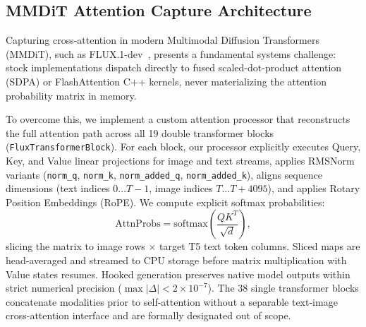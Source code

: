 \subsection{MMDiT Attention Capture Architecture}
\label{sec:method_flux_capture}
Capturing cross-attention in modern Multimodal Diffusion Transformers (MMDiT), such as FLUX.1-dev~\citep{flux2024}, presents a fundamental systems challenge: stock implementations dispatch directly to fused scaled-dot-product attention (SDPA) or FlashAttention C++ kernels, never materializing the attention probability matrix in memory. 

To overcome this, we implement a custom attention processor that reconstructs the full attention path across all 19 double transformer blocks (\texttt{FluxTransformerBlock}). For each block, our processor explicitly executes Query, Key, and Value linear projections for image and text streams, applies RMSNorm variants (\texttt{norm\_q}, \texttt{norm\_k}, \texttt{norm\_added\_q}, \texttt{norm\_added\_k}), aligns sequence dimensions (text indices $0 \dots T-1$, image indices $T \dots T+4095$), and applies Rotary Position Embeddings (RoPE). We compute explicit softmax probabilities:
\begin{equation}
\text{AttnProbs} = \text{softmax}\left(\frac{Q K^T}{\sqrt{d}}\right),
\end{equation}
slicing the matrix to image rows $\times$ target T5 text token columns. Sliced maps are head-averaged and streamed to CPU storage before matrix multiplication with Value states resumes. Hooked generation preserves native model outputs within strict numerical precision ($\max |\Delta| < 2 \times 10^{-7}$). The 38 single transformer blocks concatenate modalities prior to self-attention without a separable text-image cross-attention interface and are formally designated out of scope.

